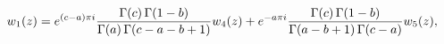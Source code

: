 \[w_{1}(z)=e^{(c-a)\pi i}\frac{\mathop{\Gamma\/}\nolimits\!\left(c\right)\mathop%
{\Gamma\/}\nolimits\!\left(1-b\right)}{\mathop{\Gamma\/}\nolimits\!\left(a%
\right)\mathop{\Gamma\/}\nolimits\!\left(c-a-b+1\right)}w_{4}(z)+e^{-a\pi i}%
\frac{\mathop{\Gamma\/}\nolimits\!\left(c\right)\mathop{\Gamma\/}\nolimits\!%
\left(1-b\right)}{\mathop{\Gamma\/}\nolimits\!\left(a-b+1\right)\mathop{\Gamma%
\/}\nolimits\!\left(c-a\right)}w_{5}(z),\]